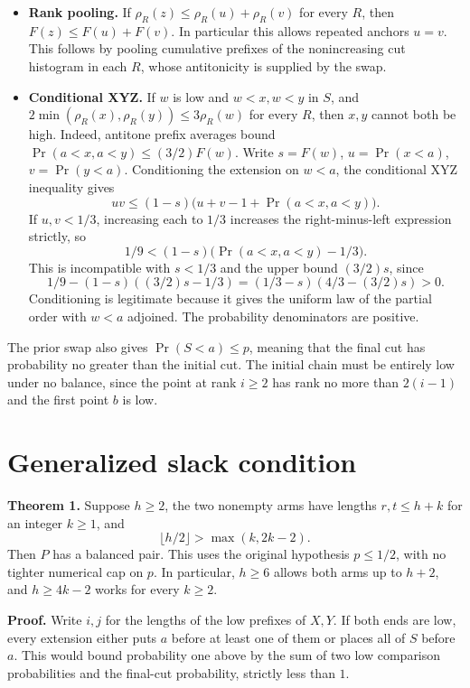 \documentclass[10pt,letterpaper]{article}
\providecommand{\tightlist}{\setlength{\itemsep}{0pt}\setlength{\parskip}{0pt}}
\begin{document}
\begin{itemize}
\tightlist
\item
  \textbf{Rank pooling.} If \(\rho_R(z)\le\rho_R(u)+\rho_R(v)\) for
  every \(R\), then \(F(z)\le F(u)+F(v)\). In particular this allows
  repeated anchors \(u=v\). This follows by pooling cumulative prefixes
  of the nonincreasing cut histogram in each \(R\), whose antitonicity
  is supplied by the swap.
\item
  \textbf{Conditional XYZ.} If \(w\) is low and \(w<x,w<y\) in \(S\),
  and \(2\min(\rho_R(x),\rho_R(y))\le3\rho_R(w)\) for every \(R\), then
  \(x,y\) cannot both be high. Indeed, antitone prefix averages bound
  \(\Pr(a<x,a<y)\le(3/2)F(w)\). Write \(s=F(w)\), \(u=\Pr(x<a)\),
  \(v=\Pr(y<a)\). Conditioning the extension on \(w<a\), the conditional
  XYZ inequality gives \[
    uv\le(1-s)\bigl(u+v-1+\Pr(a<x,a<y)\bigr).
  \] If \(u,v<1/3\), increasing each to \(1/3\) increases the
  right-minus-left expression strictly, so \[
    1/9 < (1-s)\bigl(\Pr(a<x,a<y)-1/3\bigr).
  \] This is incompatible with \(s<1/3\) and the upper bound \((3/2)s\),
  since \[
    1/9-(1-s)((3/2)s-1/3)=(1/3-s)(4/3-(3/2)s)>0.
  \] Conditioning is legitimate because it gives the uniform law of the
  partial order with \(w<a\) adjoined. The probability denominators are
  positive.
\end{itemize}

The prior swap also gives \(\Pr(S<a)\le p\), meaning that the final cut
has probability no greater than the initial cut. The initial chain must
be entirely low under no balance, since the point at rank \(i\ge2\) has
rank no more than \(2(i-1)\) and the first point \(b\) is low.

\section{Generalized slack condition}\label{generalized-slack-condition}

\textbf{Theorem 1.} Suppose \(h\ge2\), the two nonempty arms have
lengths \(r,t\le h+k\) for an integer \(k\ge1\), and \[
    \lfloor h/2\rfloor > \max(k,2k-2).
\] Then \(P\) has a balanced pair. This uses the original hypothesis
\(p\le1/2\), with no tighter numerical cap on \(p\). In particular,
\(h\ge6\) allows both arms up to \(h+2\), and \(h\ge4k-2\) works for
every \(k\ge2\).

\textbf{Proof.} Write \(i,j\) for the lengths of the low prefixes of
\(X,Y\). If both ends are low, every extension either puts \(a\) before
at least one of them or places all of \(S\) before \(a\). This would
bound probability one above by the sum of two low comparison
probabilities and the final-cut probability, strictly less than \(1\).
\end{document}
